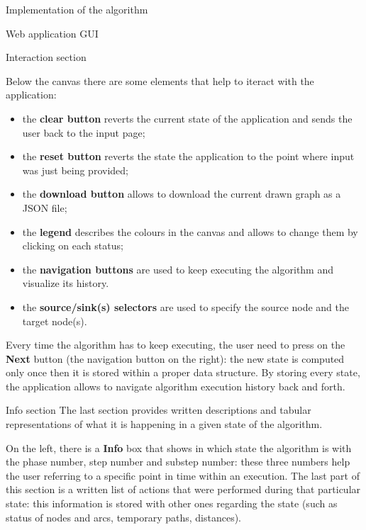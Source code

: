 \documentclass[9pt]{extarticle}
\begin{document}
\begin{section}{Implementation of the algorithm}
\begin{subsection}{Web application GUI}
            \begin{subsubsection}{Interaction section}
                \label{subsec:interaction}

                Below the canvas there are some elements that help to iteract with the application:
                \begin{itemize}
                    \item the \textbf{clear button} reverts the current state of the application and sends the user back to the input page;
                    \item the \textbf{reset button} reverts the state the application to the point where input was just being provided;
                    \item the \textbf{download button} allows to download the current drawn graph as a JSON file;
                    \item the \textbf{legend} describes the colours in the canvas and allows to change them by clicking on each status;
                    \item the \textbf{navigation buttons} are used to keep executing the algorithm and visualize its history.
                    \item the \textbf{source/sink(s) selectors} are used to specify the source node and the target node(s).
                \end{itemize}

                Every time the algorithm has to keep executing, the user need to press on the \textbf{Next} button (the navigation button on the right): the
                new state is computed only once then it is stored within a proper data structure. 
                By storing every state, the application allows to navigate algorithm execution history back and forth.

            \end{subsubsection}

            \begin{subsubsection}{Info section}
                The last section provides written descriptions and tabular representations of what it is happening in a given state of the algorithm.
                
                On the left, there is a \textbf{Info} box that shows in which state the algorithm is with the phase number, step number and substep number:
                these three numbers help the user referring to a specific point in time within an execution. 
                The last part of this section is a written list of actions that were performed during that particular state: this information is stored with other 
                ones regarding the state (such as status of nodes and arcs, temporary paths, distances).


\end{subsubsection}
\end{subsection}
\end{section}
\end{document}
